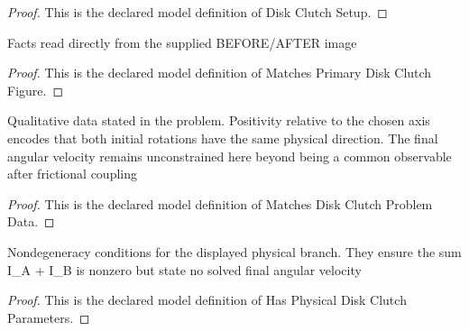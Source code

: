 \begin{proof}
  This is the declared model definition of Disk Clutch Setup.
\end{proof}
\begin{definition}
  \label{def:physics:phyx-mini-0826:phyxminiproblems-problemphyxmini0826-matchesprimarydiskclutchfigure}
  Facts read directly from the supplied BEFORE/AFTER image
\end{definition}
\begin{proof}
  This is the declared model definition of Matches Primary Disk Clutch Figure.
\end{proof}
\begin{definition}
  \label{def:physics:phyx-mini-0826:phyxminiproblems-problemphyxmini0826-matchesdiskclutchproblemdata}
  Qualitative data stated in the problem. Positivity relative to the chosen axis encodes that both initial rotations have the same physical direction. The final angular velocity remains unconstrained here beyond being a common observable after frictional coupling
\end{definition}
\begin{proof}
  This is the declared model definition of Matches Disk Clutch Problem Data.
\end{proof}
\begin{definition}
  \label{def:physics:phyx-mini-0826:phyxminiproblems-problemphyxmini0826-hasphysicaldiskclutchparameters}
  Nondegeneracy conditions for the displayed physical branch. They ensure the sum I\_A + I\_B is nonzero but state no solved final angular velocity
\end{definition}
\begin{proof}
  This is the declared model definition of Has Physical Disk Clutch Parameters.
\end{proof}
